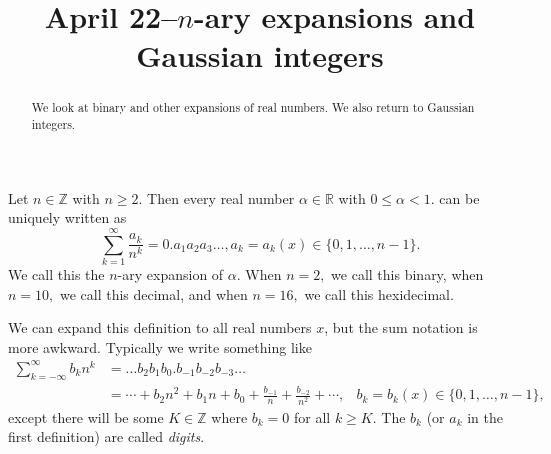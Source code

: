 \documentclass{ximera}
\title{April 22--$n$-ary expansions and Gaussian integers}
\begin{document}
  
\begin{abstract}  We look at binary and other expansions of real numbers. We also return to Gaussian integers.
\end{abstract}  
\maketitle  

\begin{definition} Let $n\in\mathbb{Z}$ with $n\geq 2$. Then every real number $\alpha\in\mathbb{R}$ with $0\leq\alpha<1$. can be uniquely written as 
\[\displaystyle\sum_{k=1}^\infty \frac{a_k}{n^k}=0.a_1a_2a_3\dots,a_k=a_k(x)\in\{0,1,\dots,n-1\}.\] We call this the $n$-ary expansion of $\alpha$. When $n=2,$ we call this binary, when $n=10,$ we call this decimal, and when $n=16,$ we call this hexidecimal.

We can expand this definition to all real numbers $x$, but the sum notation is more awkward. Typically we write something like
 \begin{align*}
 \displaystyle\sum_{k=-\infty}^\infty {b_k}{n^k}&=\dots b_2b_1b_0.b_{-1}b_{-2}b_{-3}\dots\\
 &=\cdots+b_2 n^2+b_1 n+b_0+\frac{b_{-1}}{n}+\frac{b_{-2}}{n^2}+\cdots, 
& b_k=b_k(x)\in\{0,1,\dots,n-1\},\end{align*} 
 except there will be some $K\in\mathbb{Z}$ where $b_k=0$ for all $k\geq K$. The $b_k$ (or $a_k$ in the first definition) are called \emph{digits}.
\end{definition}
\end{document}
